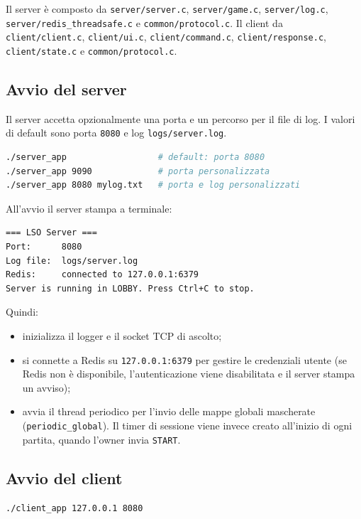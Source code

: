 \documentclass[a4paper,11pt]{article}
\begin{document}
Il server è composto da \texttt{server/server.c}, \texttt{server/game.c},
\texttt{server/log.c}, \texttt{server/redis\_threadsafe.c} e
\texttt{common/protocol.c}. Il client da
\texttt{client/client.c}, \texttt{client/ui.c}, \texttt{client/command.c},
\texttt{client/response.c}, \texttt{client/state.c} e \texttt{common/protocol.c}.

\subsection{Avvio del server}

Il server accetta opzionalmente una porta e un percorso per il file di log.
I valori di default sono porta \texttt{8080} e log \texttt{logs/server.log}.

\begin{lstlisting}[language=bash]
./server_app                  # default: porta 8080
./server_app 9090             # porta personalizzata
./server_app 8080 mylog.txt   # porta e log personalizzati
\end{lstlisting}

All'avvio il server stampa a terminale:

\begin{lstlisting}[basicstyle=\ttfamily\small,frame=none]
=== LSO Server ===
Port:      8080
Log file:  logs/server.log
Redis:     connected to 127.0.0.1:6379
Server is running in LOBBY. Press Ctrl+C to stop.
\end{lstlisting}

Quindi:
\begin{itemize}[topsep=0.3em]
    \item inizializza il logger e il socket TCP di ascolto;
    \item si connette a Redis su \texttt{127.0.0.1:6379} per gestire le credenziali
          utente (se Redis non è disponibile, l'autenticazione viene disabilitata
          e il server stampa un avviso);
    \item avvia il thread periodico per l'invio delle mappe globali mascherate
          (\texttt{periodic\_global}). Il timer di sessione viene invece creato
          all'inizio di ogni partita, quando l'owner invia \texttt{START}.
\end{itemize}

\subsection{Avvio del client}

\begin{lstlisting}[language=bash]
./client_app 127.0.0.1 8080
\end{lstlisting}
\end{document}
